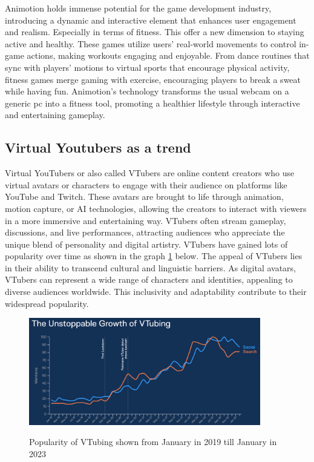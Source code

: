 Animotion holds immense potential for the game development industry, introducing a dynamic and interactive element that enhances user engagement and realism. Especially 
in terms of fitness. This offer a new dimension to staying active and healthy. These games utilize users' real-world movements to control 
in-game actions, making workouts engaging and enjoyable. From dance routines that sync with players' motions to virtual sports that encourage 
physical activity, fitness games merge gaming with exercise, encouraging players to break a sweat while having fun. Animotion's technology 
transforms the usual webcam on a generic pc into a fitness tool, promoting a healthier lifestyle through interactive and entertaining gameplay.

\subsection{Virtual Youtubers as a trend}
Virtual YouTubers or also called VTubers are online content creators who use virtual avatars or characters to engage with their 
audience on platforms like YouTube and Twitch. These avatars are brought to life through animation, motion capture, 
or AI technologies, allowing the creators to interact with viewers in a more immersive and entertaining way. 
VTubers often stream gameplay, discussions, and live performances, attracting audiences who appreciate the 
unique blend of personality and digital artistry. VTubers have gained lots of popularity over time as shown in the graph \ref{fig:vtubers} below.
The appeal of VTubers lies in their ability to transcend cultural and linguistic barriers. As digital avatars, 
VTubers can represent a wide range of characters and identities, appealing to diverse audiences worldwide. 
This inclusivity and adaptability contribute to their widespread popularity. \cite{vtubing1}
\\
\begin{figure}[htb]
    \centering
    \includegraphics[width=0.9\textwidth]{pics/riseofvtubers2.png}
    \caption{Popularity of VTubing shown from January in 2019 till January in 2023}
    \cite{vtubing1}
    \label{fig:vtubers}
\end{figure}
